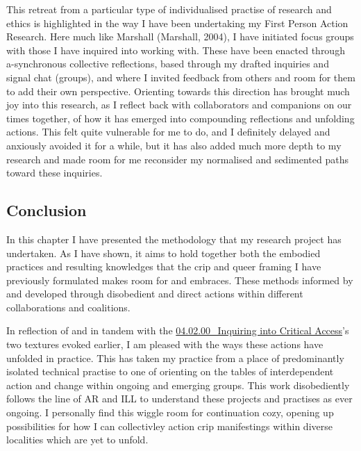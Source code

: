 This retreat from a particular type of individualised practise of
research and ethics is highlighted in the way I have been undertaking my
First Person Action Research. Here much like Marshall (Marshall, 2004),
I have initiated focus groups with those I have inquired into working
with. These have been enacted through a-synchronous collective
reflections, based through my drafted inquiries and signal chat
(groups), and where I invited feedback from others and room for them to
add their own perspective. Orienting towards this direction has brought
much joy into this research, as I reflect back with collaborators and
companions on our times together, of how it has emerged into compounding
reflections and unfolding actions. This felt quite vulnerable for me to
do, and I definitely delayed and anxiously avoided it for a while, but
it has also added much more depth to my research and made room for me
reconsider my normalised and sedimented paths toward these inquiries.

\hypertarget{conclusion}{%
\subsection[Conclusion]{\texorpdfstring{\protect\hypertarget{anchor}{}{}Conclusion}{Conclusion}}\label{conclusion}}

In this chapter I have presented the methodology that my research
project has undertaken. As I have shown, it aims to hold together both
the embodied practices and resulting knowledges that the crip and queer
framing I have previously formulated makes room for and embraces. These
methods informed by and developed through disobedient and direct actions
within different collaborations and coalitions.

In reflection of and in tandem with the
\href{../../04_Configure-able_Methods/sections/04.02.00_Inquiring\%20into\%20Critical\%20Access.md}{04.02.00\_Inquiring
into Critical Access}'s two textures evoked earlier, I am pleased with
the ways these actions have unfolded in practice. This has taken my
practice from a place of predominantly isolated technical practise to
one of orienting on the tables of interdependent action and change
within ongoing and emerging groups. This work disobediently follows the
line of AR and ILL to understand these projects and practises as ever
ongoing. I personally find this wiggle room for continuation cozy,
opening up possibilities for how I can collectivley action crip
manifestings within diverse localities which are yet to unfold.
